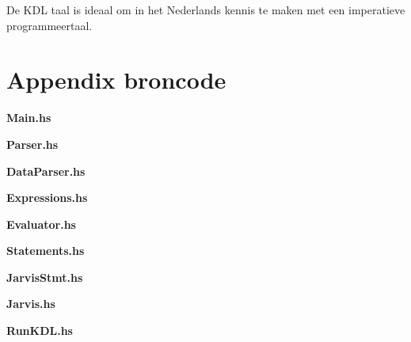 \documentclass[a4paper]{article}
\begin{document}
De KDL taal is ideaal om in het Nederlands kennis te maken met een imperatieve programmeertaal.


\section{Appendix broncode}
\label{sec:broncode}


\begin{center}
	\textbf{Main.hs}
\end{center}

\begin{center}
	\textbf{Parser.hs}
\end{center}

\begin{center}
	\textbf{DataParser.hs}
\end{center}

\begin{center}
	\textbf{Expressions.hs}
\end{center}

\begin{center}
	\textbf{Evaluator.hs}
\end{center}

\begin{center}
	\textbf{Statements.hs}
\end{center}

\begin{center}
	\textbf{JarvisStmt.hs}
\end{center}

\begin{center}
	\textbf{Jarvis.hs}
\end{center}

\begin{center}
	\textbf{RunKDL.hs}
\end{center}

\end{document}
